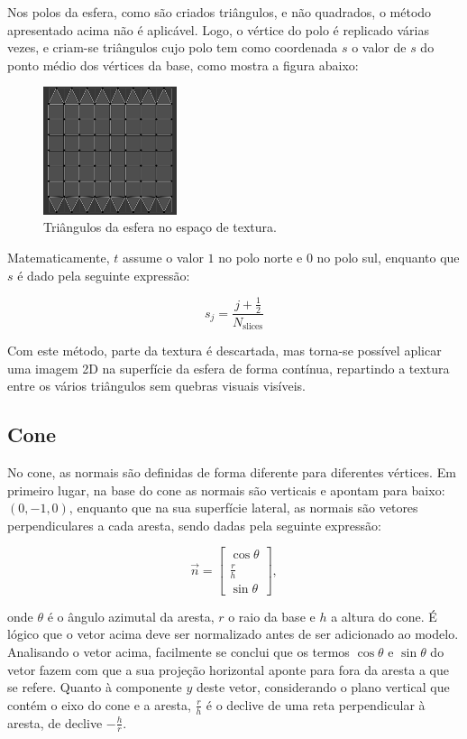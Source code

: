 \documentclass[12pt, a4paper]{article}
\begin{document}
Nos polos da esfera, como são criados triângulos, e não quadrados, o método apresentado acima não é
aplicável. Logo, o vértice do polo é replicado várias vezes, e criam-se triângulos cujo polo tem
como coordenada $s$ o valor de $s$ do ponto médio dos vértices da base, como mostra a figura abaixo:

\begin{figure}[H]
    \centering
    \includegraphics[width=0.35\textwidth]{res/phase4/SphereUV.png}
    \caption{Triângulos da esfera no espaço de textura.}
\end{figure}

Matematicamente, $t$ assume o valor $1$ no polo norte e $0$ no polo sul, enquanto que $s$ é dado
pela seguinte expressão:

$$
s_j = \frac{j + \frac{1}{2}}{N_\text{slices}}
$$

Com este método, parte da textura é descartada, mas torna-se possível aplicar uma imagem 2D na
superfície da esfera de forma contínua, repartindo a textura entre os vários triângulos sem quebras
visuais visíveis.

\subsection{Cone}

No cone, as normais são definidas de forma diferente para diferentes vértices. Em primeiro lugar, na
base do cone as normais são verticais e apontam para baixo: $(0, -1, 0)$, enquanto que na sua
superfície lateral, as normais são vetores perpendiculares a cada aresta, sendo dadas pela seguinte
expressão:

$$
\vec{n} =
\begin{bmatrix}
    \cos \theta \\
    \frac{r}{h} \\
    \sin \theta
\end{bmatrix},
$$

onde $\theta$ é o ângulo azimutal da aresta, $r$ o raio da base e $h$ a altura do cone. É lógico que
o vetor acima deve ser normalizado antes de ser adicionado ao modelo. Analisando o vetor acima,
facilmente se conclui que os termos $\cos \theta$ e $\sin \theta$ do vetor fazem com que a sua
projeção horizontal aponte para fora da aresta a que se refere. Quanto à componente $y$ deste
vetor, considerando o plano vertical que contém o eixo do cone e a aresta, $\frac{r}{h}$ é o declive
de uma reta perpendicular à aresta, de declive $-\frac{h}{r}$.
\end{document}
